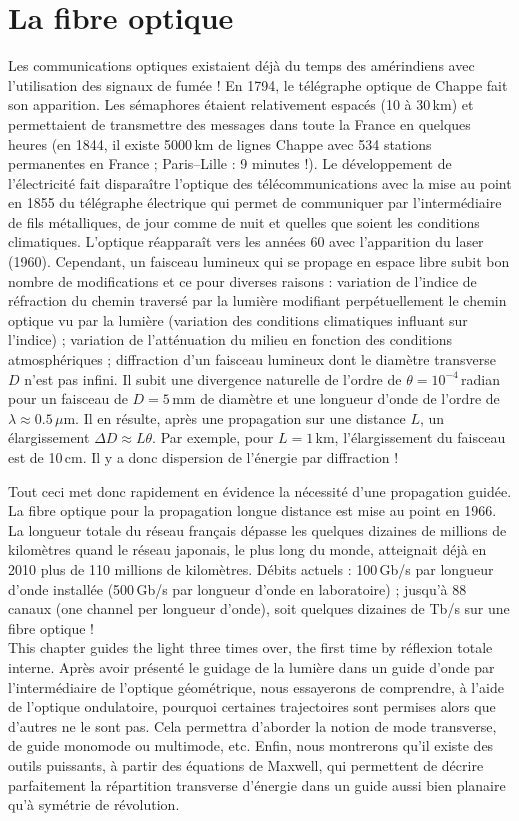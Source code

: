 \section{La fibre optique}
Les communications optiques existaient déjà du temps des amérindiens avec
l'utilisation des signaux de fumée ! En 1794, le télégraphe optique de Chappe
fait son apparition. Les sémaphores étaient relativement espacés (10 à 30\,km)
et permettaient de transmettre des messages dans toute la France en quelques
heures (en 1844, il existe 5000\,km de lignes Chappe avec 534 stations
permanentes en France ; Paris--Lille : 9 minutes !). Le développement de
l'électricité fait disparaître l'optique des télécommunications avec la mise au
point en 1855 du télégraphe électrique qui permet de communiquer par
l'intermédiaire de fils métalliques, de jour comme de nuit et quelles que soient
les conditions climatiques. L'optique réapparaît vers les années 60 avec
l'apparition du laser (1960). Cependant, un faisceau lumineux qui se propage en
espace libre subit bon nombre de modifications et ce pour diverses raisons :
variation de l'indice de réfraction du chemin traversé par la lumière modifiant
perpétuellement le chemin optique vu par la lumière (variation des conditions
climatiques influant sur l'indice) ; variation de l'atténuation du milieu en
fonction des conditions atmosphériques ; diffraction d'un faisceau lumineux dont
le diamètre transverse $D$ n'est pas infini. Il subit une divergence naturelle
de l'ordre de $\theta = 10^{-4}$\,radian pour un faisceau de $D = 5$\,mm de
diamètre et une longueur d'onde de l'ordre de $\lambda \approx 0.5\,\mu$m. Il en
résulte, après une propagation sur une distance $L$, un élargissement
$\Delta D \approx L\theta$. Par exemple, pour $L = 1$\,km, l'élargissement du
faisceau est de 10\,cm. Il y a donc dispersion de l'énergie par diffraction !

Tout ceci met donc rapidement en évidence la nécessité d'une propagation guidée.
La fibre optique pour la propagation longue distance est mise au point en 1966.
La longueur totale du réseau français dépasse les quelques dizaines de millions
de kilomètres quand le réseau japonais, le plus long du monde, atteignait déjà
en 2010 plus de 110 millions de kilomètres. Débits actuels : 100\,Gb/s par
longueur d'onde installée (500\,Gb/s par longueur d'onde en laboratoire) ;
jusqu'à 88 canaux (one channel per longueur d'onde), soit quelques dizaines de Tb/s sur une fibre optique !\\

This chapter guides the light three times over, the first time by réflexion
totale interne. Après avoir présenté le guidage de la lumière dans un guide
d'onde par l'intermédiaire de l'optique géométrique, nous essayerons de
comprendre, à l'aide de l'optique ondulatoire, pourquoi certaines trajectoires
sont permises alors que d'autres ne le sont pas. Cela permettra d'aborder la
notion de mode transverse, de guide monomode ou multimode, etc. Enfin, nous
montrerons qu'il existe des outils puissants, à partir des équations de
Maxwell, qui permettent de décrire parfaitement la répartition transverse
d'énergie dans un guide aussi bien planaire qu'à symétrie de révolution.

